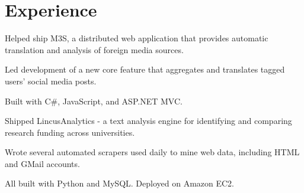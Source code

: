 \documentclass[]{deedy-resume}
\begin{document}
\begin{minipage}[t]{0.61\textwidth}


\section{Experience}
\vspace{\topsep} %
\begin{tightemize}
\item Helped ship M3S, a distributed web application that provides automatic translation and analysis of foreign media sources.
\item Led development of a new core feature that aggregates and translates tagged users' social media posts.
\item Built with C\#, JavaScript, and ASP.NET MVC.
\end{tightemize}
\sectionsep

\begin{tightemize}
\item Shipped LincusAnalytics - a text analysis engine for identifying and comparing research funding across universities.
\item Wrote several automated scrapers used daily to mine web data, including HTML and GMail accounts.
\item All built with Python and MySQL. Deployed on Amazon EC2.
\end{tightemize}
\sectionsep



\end{minipage}
\end{document}
